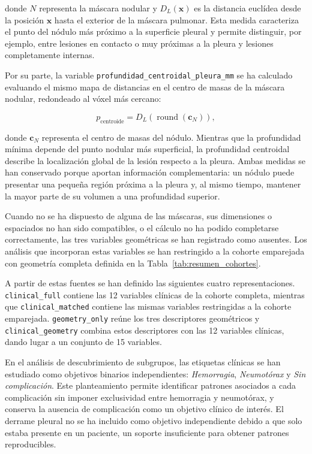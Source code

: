 donde \(N\) representa la máscara nodular y \(D_L(\mathbf{x})\) es la distancia euclídea desde la posición \(\mathbf{x}\) hasta el exterior de la máscara pulmonar. Esta medida caracteriza el punto del nódulo más próximo a la superficie pleural y permite distinguir, por ejemplo, entre lesiones en contacto o muy próximas a la pleura y lesiones completamente internas.

Por su parte, la variable \texttt{profundidad\_centroidal\_pleura\_mm} se ha calculado evaluando el mismo mapa de distancias en el centro de masas de la máscara nodular, redondeado al vóxel más cercano:

\[
p_{\mathrm{centroide}}
=
D_L\left(\operatorname{round}(\mathbf{c}_N)\right),
\]

donde \(\mathbf{c}_N\) representa el centro de masas del nódulo. Mientras que la profundidad mínima depende del punto nodular más superficial, la profundidad centroidal describe la localización global de la lesión respecto a la pleura. Ambas medidas se han conservado porque aportan información complementaria: un nódulo puede presentar una pequeña región próxima a la pleura y, al mismo tiempo, mantener la mayor parte de su volumen a una profundidad superior.


Cuando no se ha dispuesto de alguna de las máscaras, sus dimensiones o espaciados no han sido compatibles, o el cálculo no ha podido completarse correctamente, las tres variables geométricas se han registrado como ausentes. Los análisis que incorporan estas variables se han restringido a la cohorte emparejada con geometría completa definida en la Tabla~\ref{tab:resumen_cohortes}.

A partir de estas fuentes se han definido las siguientes cuatro representaciones. \texttt{clinical\_full} contiene las 12 variables clínicas de la cohorte completa, mientras que \texttt{clinical\_matched} contiene las mismas variables restringidas a la cohorte emparejada. \texttt{geometry\_only} reúne los tres descriptores geométricos y \texttt{clinical\_geometry} combina estos descriptores con las 12 variables clínicas, dando lugar a un conjunto de 15 variables.

En el análisis de descubrimiento de subgrupos, las etiquetas clínicas se han estudiado como objetivos binarios independientes: \textit{Hemorragia}, \textit{Neumotórax} y \textit{Sin complicación}. Este planteamiento permite identificar patrones asociados a cada complicación sin imponer exclusividad entre hemorragia y neumotórax, y conserva la ausencia de complicación como un objetivo clínico de interés. El derrame pleural no se ha incluido como objetivo independiente debido a que solo estaba presente en un paciente, un soporte insuficiente para obtener patrones reproducibles.

